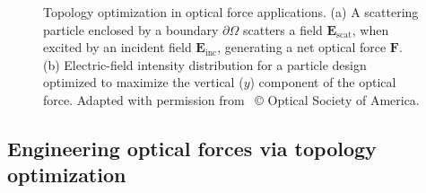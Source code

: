 \begin{figure}[tb]
    \centering
    \caption{Topology optimization in optical force applications. (a) A scattering particle 
    enclosed by a boundary $\partial \Omega$ scatters a field $\mathbf{E}_\text{scat}$, when excited by an incident field $\mathbf{E}_\text{inc}$, 
    generating a net optical force $\mathbf{F}$. (b) Electric-field intensity distribution for a particle design optimized to maximize the vertical ($y$)
    component of the optical force. Adapted with permission from~\cite{ownpub2} © Optical Society of America.}
    \label{fig:eng_res}
\end{figure}

\subsection*{Engineering optical forces via topology optimization}

